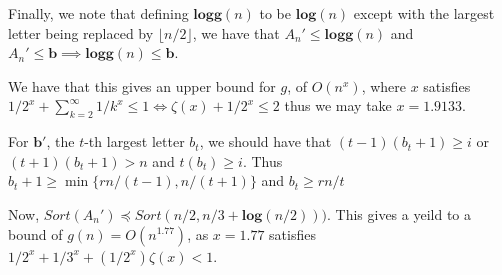 \documentclass{article}
\begin{document}
Finally, we note that defining $\textbf{logg}(n)$ to be $\textbf{log}(n)$ except with the largest letter being replaced by $\lfloor n/2\rfloor$, we have that $A_n' \le \textbf{logg}(n)$ and $A_n' \le \textbf{b} \implies \textbf{logg}(n)\le \textbf{b}$.

We have that this gives an upper bound for $g$, of $O(n^x)$, where $x$ satisfies $1/2^x+ \sum_{k=2}^\infty 1/k^x \le 1\iff \zeta(x) +1/2^x\le 2 $ thus we may take $x = 1.9133$.


For $\textbf{b}'$, the $t$-th largest letter $b_t$, we should have that $(t-1)(b_t+1) \ge i$ or $(t+1)(b_t+1) > n$ and $t(b_t) \ge i$. Thus $b_t+1 \ge \min\{ rn/(t-1), n/(t+1)\}$ and $b_t \ge rn/t$

Now, $Sort(A_n')\preceq Sort(n/2,n/3 + \textbf{log}(n/2))) $. This gives a yeild to a bound of $g(n) = O(n^{1.77})$, as $x=1.77$ satisfies $1/2^x + 1/3^x +(1/2^x)\zeta(x)<1$.
\end{document}
